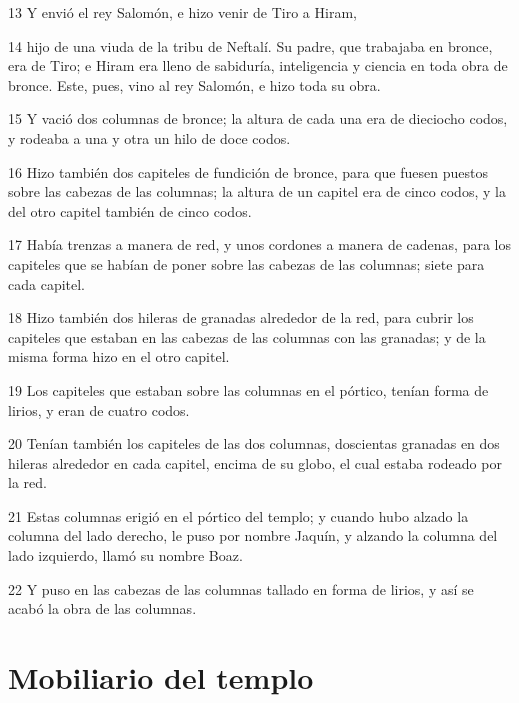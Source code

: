 \par 13 Y envió el rey Salomón, e hizo venir de Tiro a Hiram,
\par 14 hijo de una viuda de la tribu de Neftalí. Su padre, que trabajaba en bronce, era de Tiro; e Hiram era lleno de sabiduría, inteligencia y ciencia en toda obra de bronce. Este, pues, vino al rey Salomón, e hizo toda su obra.
\par 15 Y vació dos columnas de bronce; la altura de cada una era de dieciocho codos,  y rodeaba a una y otra un hilo de doce codos.
\par 16 Hizo también dos capiteles de fundición de bronce, para que fuesen puestos sobre las cabezas de las columnas; la altura de un capitel era de cinco codos,  y la del otro capitel también de cinco codos.
\par 17 Había trenzas a manera de red, y unos cordones a manera de cadenas, para los capiteles que se habían de poner sobre las cabezas de las columnas; siete para cada capitel.
\par 18 Hizo también dos hileras de granadas alrededor de la red, para cubrir los capiteles que estaban en las cabezas de las columnas con las granadas; y de la misma forma hizo en el otro capitel.
\par 19 Los capiteles que estaban sobre las columnas en el pórtico, tenían forma de lirios, y eran de cuatro codos.
\par 20 Tenían también los capiteles de las dos columnas, doscientas granadas en dos hileras alrededor en cada capitel, encima de su globo, el cual estaba rodeado por la red.
\par 21 Estas columnas erigió en el pórtico del templo; y cuando hubo alzado la columna del lado derecho, le puso por nombre Jaquín, y alzando la columna del lado izquierdo, llamó su nombre Boaz.
\par 22 Y puso en las cabezas de las columnas tallado en forma de lirios, y así se acabó la obra de las columnas.

\section*{Mobiliario del templo}

